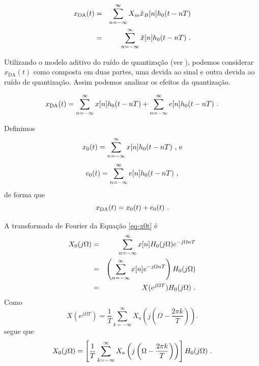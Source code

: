\begin{frame}[allowframebreaks]
  \begin{eqnarray}
  x_{\text{DA}}(t) &=& \sum_{n=-\infty}^{\infty} X_m \hat{x}_B[n] h_0(t-nT) \nonumber \\
            &=& \sum_{n=-\infty}^{\infty} \hat{x}[n] h_0(t-nT) \textmd{ .}
  \end{eqnarray}

  \framebreak

  Utilizando o modelo aditivo do ruído de quantização (ver ),
  podemos considerar $x_{\text{DA}}(t)$ como composta em duas partes, uma devida ao sinal
  e outra devida ao ruído de quantização. Assim podemos analisar os efeitos da quantização.

  \begin{equation}
   x_{\text{DA}}(t) = \sum_{n=-\infty}^{\infty} x[n]h_0(t-nT) + \sum_{n=-\infty}^{\infty} e[n] h_0(t-nT) \textmd{ .}
  \end{equation}

  Definimos
  \begin{equation}
  \label{eq-x0t}
  x_0(t) = \sum_{n=-\infty}^{\infty} x[n]h_0(t-nT) \textmd{ , e}
  \end{equation}
  \begin{equation}
  \label{eq-e0t}
  e_0(t) = \sum_{n=-\infty}^{\infty} e[n] h_0(t-nT) \textmd{ ,}
  \end{equation}
  de forma que
  \begin{equation}
  x_{\text{DA}}(t) = x_0(t) + e_0(t) \textmd{ .}
  \end{equation}

  A transformada de Fourier da Equação \ref{eq-x0t} é
  \begin{eqnarray}
  X_0(j\Omega) &=& \sum_{n=-\infty}^{\infty} x[n] H_0(j\Omega) e^{-j \Omega nT} \nonumber \\
               &=& \left( \sum_{n=-\infty}^{\infty} x[n] e^{-j \Omega nT} \right) H_0(j\Omega) \nonumber \\
               &=& X(e^{j\Omega T}) H_0(j\Omega) \textmd{ .}
  \end{eqnarray}
  Como
  \vspace{-0.2cm}
  \begin{equation}
  X(e^{j\Omega T}) = \frac{1}{T} \sum_{k=-\infty}^{\infty} X_a \left( j \left( \Omega - \frac{2\pi k}{T} \right) \right) .
  \end{equation}
  segue que
  \vspace{-0.2cm}
  \begin{equation}
  \label{eq-X0jomega}
  X_0(j\Omega) = \left[  \frac{1}{T} \sum_{k=-\infty}^{\infty} X_a \left( j \left( \Omega - \frac{2\pi k}{T} \right) \right) \right] H_0(j\Omega) \textmd{ .}
  \end{equation}
\end{frame}

